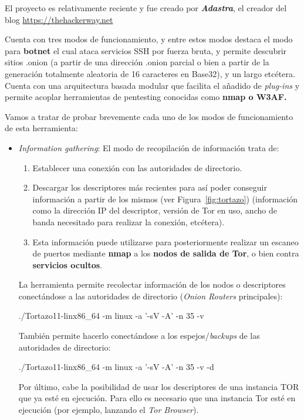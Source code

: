 El proyecto es relativamente reciente y fue creado por \textbf{\textit{Adastra}}, el creador del blog \url{https://thehackerway.net}

Cuenta con tres modos de funcionamiento, y entre estos modos destaca el modo para \textbf{botnet} el cual ataca servicios SSH por fuerza bruta, y permite descubrir sitios .onion (a partir de una dirección .onion parcial o bien a partir de la generación totalmente aleatoria de 16 caracteres en Base32), y un largo etcétera. Cuenta con una arquitectura basada modular que facilita el añadido de \textit{plug-ins} y permite acoplar herramientas de pentesting conocidas como \textbf{nmap o W3AF.}

Vamos a tratar de probar brevemente cada uno de los modos de funcionamiento de esta herramienta:

\begin{itemize}
	\item{\textit{Information gathering}}: El modo de recopilación de información trata de:
	\begin{enumerate}
		\item Establecer una conexión con las autoridades de directorio.
		\item Descargar los descriptores más recientes para así poder conseguir información a partir de los mismos (ver Figura~\ref{fig:tortazo}) (información como  la dirección IP del descriptor, versión de Tor en uso, ancho de banda necesitado para realizar la conexión, etcétera). 
		\item Esta información puede utilizarse para posteriormente realizar un escaneo de puertos mediante \textbf{nmap} a los \textbf{nodos de salida de Tor}, o bien contra \textbf{servicios ocultos}. 
	\end{enumerate}
	
	La herramienta permite recolectar información de los nodos o descriptores conectándose a las autoridades de directorio (\textit{Onion Routers} principales):
	
	{\selectfont 
		./Tortazo11-linx86\_64 -m linux -a '-sV -A' -n 35 -v
	}
	
	También permite hacerlo conectándose a los espejos/\textit{backups} de las autoridades de directorio:
	
	{\selectfont 
		./Tortazo11-linx86\_64 -m linux -a '-sV -A' -n 35 -v -d
	}
	
	Por último, cabe la posibilidad de usar los descriptores de una instancia TOR que ya esté en ejecución. Para ello es necesario que una instancia Tor esté en ejecución (por ejemplo, lanzando el \textit{Tor Browser}).
	

\end{itemize}
